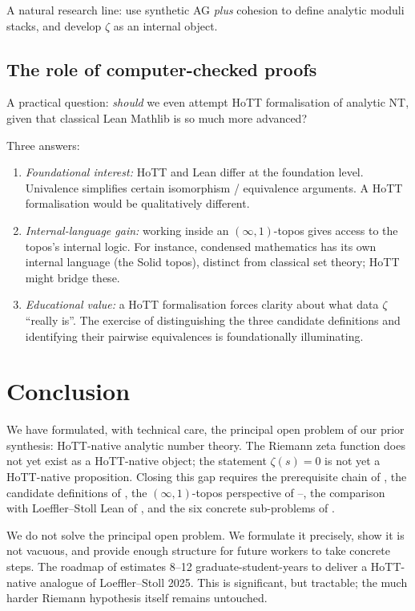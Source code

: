 \documentclass[12pt]{article}
\theoremstyle{definition}
\theoremstyle{remark}
\begin{document}
A natural research line: use synthetic AG \emph{plus} cohesion to define
analytic moduli stacks, and develop $\zeta$ as an internal object.

\subsection{The role of computer-checked proofs}

A practical question: \emph{should} we even attempt HoTT formalisation of
analytic NT, given that classical Lean Mathlib is so much more advanced?

Three answers:
\begin{enumerate}
\item \emph{Foundational interest:} HoTT and Lean differ at the foundation
level. Univalence simplifies certain isomorphism / equivalence arguments.
A HoTT formalisation would be qualitatively different.
\item \emph{Internal-language gain:} working inside an $(\infty,1)$-topos
gives access to the topos's internal logic. For instance, condensed
mathematics has its own internal language (the Solid topos), distinct from
classical set theory; HoTT might bridge these.
\item \emph{Educational value:} a HoTT formalisation forces clarity about
what data $\zeta$ ``really is''. The exercise of distinguishing the three
candidate definitions and identifying their pairwise equivalences is
foundationally illuminating.
\end{enumerate}

\section{Conclusion}\label{sec:conclusion}

We have formulated, with technical care, the principal open problem of our
prior synthesis: HoTT-native analytic number theory. The Riemann zeta
function does not yet exist as a HoTT-native object; the statement
$\zeta(s)=0$ is not yet a HoTT-native proposition. Closing this gap
requires the prerequisite chain of , the candidate
definitions of , the $(\infty,1)$-topos perspective of
--, the comparison with
Loeffler--Stoll Lean of , and the six concrete
sub-problems of .

We do not solve the principal open problem. We formulate it precisely, show
it is not vacuous, and provide enough structure for future workers to take
concrete steps. The roadmap of  estimates 8--12
graduate-student-years to deliver a HoTT-native analogue of Loeffler--Stoll
2025. This is significant, but tractable; the much harder Riemann
hypothesis itself remains untouched.
\end{document}

